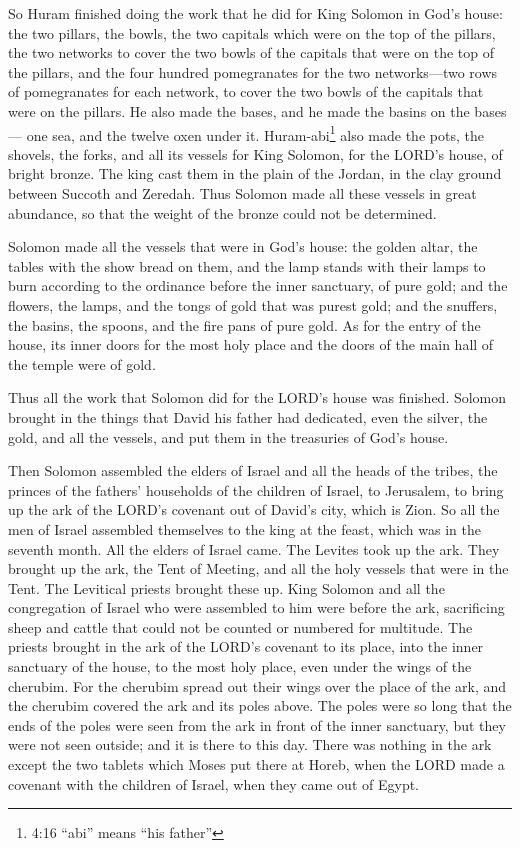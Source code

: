 So Huram finished doing the work that he did for King Solomon in God’s house:
\myverse{}the two pillars, the bowls, the two capitals which were on the top of the
pillars, the two networks to cover the two bowls of the capitals that were on the top of the pillars,
\myverse{}and the four hundred pomegranates for the two networks—two rows of pomegranates
for each network, to cover the two bowls of the capitals that were on the pillars.
\myverse{}He also made the bases, and he made the basins on the bases—
\myverse{}one sea, and the twelve oxen under it.
\myverse{}Huram-abi\footnote{4:16 “abi” means “his father”} also made the pots, the shovels, the forks, and all its vessels
for King Solomon, for the LORD’s house, of bright bronze.
\myverse{}The king cast them in the plain of the Jordan, in the clay ground between
Succoth and Zeredah.
\myverse{}Thus Solomon made all these vessels in great abundance, so that the weight
of the bronze could not be determined.

\myverse{}Solomon made all the vessels that were in God’s house: the golden
altar, the tables with the show bread on them,
\myverse{}and the lamp stands with their lamps to burn according to the ordinance before
the inner sanctuary, of pure gold;
\myverse{}and the flowers, the lamps, and the tongs of gold that was purest gold;
\myverse{}and the snuffers, the basins, the spoons, and the fire pans of pure gold.
As for the entry of the house, its inner doors for the most holy place and the doors of the main hall
of the temple were of gold.


\mychapter{} \myverse*{}Thus all the work that Solomon did for the LORD’s house was finished.
Solomon brought in the things that David his father had dedicated, even the silver, the gold, and all
the vessels, and put them in the treasuries of God’s house.

\myverse{}Then Solomon assembled the elders of Israel and all the heads of
the tribes, the princes of the fathers’ households of the children of Israel, to Jerusalem, to bring up
the ark of the LORD’s covenant out of David’s city, which is Zion.
\myverse{}So all the men of Israel assembled themselves to the king at the feast, which
was in the seventh month.
\myverse{}All the elders of Israel came. The Levites took up the ark.
\myverse{}They brought up the ark, the Tent of Meeting, and all the holy vessels that
were in the Tent. The Levitical priests brought these up.
\myverse{}King Solomon and all the congregation of Israel who were assembled to him were
before the ark, sacrificing sheep and cattle that could not be counted or numbered for multitude.
\myverse{}The priests brought in the ark of the LORD’s covenant to its place, into the
inner sanctuary of the house, to the most holy place, even under the wings of the cherubim.
\myverse{}For the cherubim spread out their wings over the place of the ark, and the cherubim
covered the ark and its poles above.
\myverse{}The poles were so long that the ends of the poles were seen from the ark in
front of the inner sanctuary, but they were not seen outside; and it is there to this day.
\myverse{}There was nothing in the ark except the two tablets which Moses put there
at Horeb, when the LORD made a covenant with the children of Israel, when they came out of Egypt.

